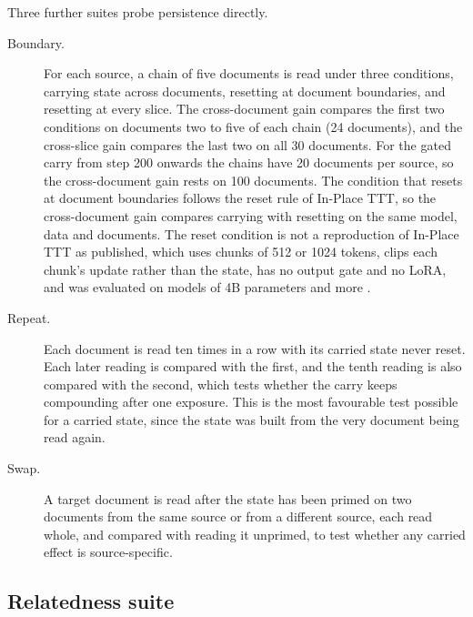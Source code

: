 \documentclass[12pt,a4paper]{report}
\begin{document}
Three further suites probe persistence directly.
\begin{description}
  \item[Boundary.] For each source, a chain of five documents is read under three conditions, carrying state across documents, resetting at document boundaries, and resetting at every slice. The cross-document gain compares the first two conditions on documents two to five of each chain (24 documents), and the cross-slice gain compares the last two on all 30 documents. For the gated carry from step 200 onwards the chains have 20 documents per source, so the cross-document gain rests on 100 documents. The condition that resets at document boundaries follows the reset rule of In-Place TTT, so the cross-document gain compares carrying with resetting on the same model, data and documents. The reset condition is not a reproduction of In-Place TTT as published, which uses chunks of 512 or 1024 tokens, clips each chunk's update rather than the state, has no output gate and no LoRA, and was evaluated on models of 4B parameters and more \citep{feng2026inplace}.
  \item[Repeat.] Each document is read ten times in a row with its carried state never reset. Each later reading is compared with the first, and the tenth reading is also compared with the second, which tests whether the carry keeps compounding after one exposure. This is the most favourable test possible for a carried state, since the state was built from the very document being read again.
  \item[Swap.] A target document is read after the state has been primed on two documents from the same source or from a different source, each read whole, and compared with reading it unprimed, to test whether any carried effect is source-specific.
\end{description}

\subsection{Relatedness suite}
\label{sec-relatedness-method}
\end{document}
